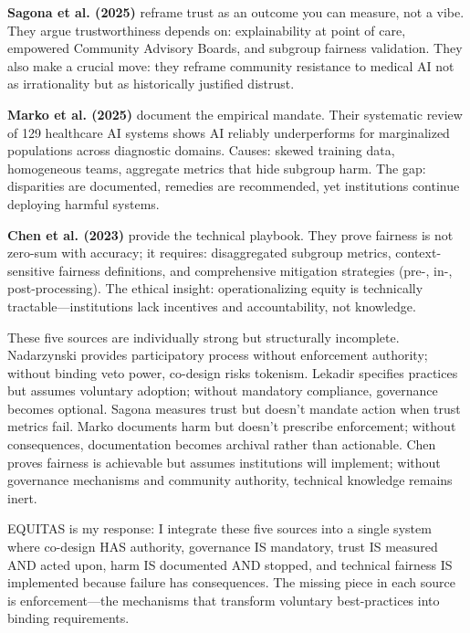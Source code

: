 \documentclass[12pt,a4paper]{article}
\begin{document}
\textbf{Sagona et al. (2025)} reframe trust as an outcome you can measure, not a vibe. They argue trustworthiness depends on: explainability at point of care, empowered Community Advisory Boards, and subgroup fairness validation. They also make a crucial move: they reframe community resistance to medical AI not as irrationality but as historically justified distrust.\cite{sagona2025}

\textbf{Marko et al. (2025)} document the empirical mandate. Their systematic review of 129 healthcare AI systems shows AI reliably underperforms for marginalized populations across diagnostic domains. Causes: skewed training data, homogeneous teams, aggregate metrics that hide subgroup harm. The gap: disparities are documented, remedies are recommended, yet institutions continue deploying harmful systems.\cite{marko2025}

\textbf{Chen et al. (2023)} provide the technical playbook. They prove fairness is not zero-sum with accuracy; it requires: disaggregated subgroup metrics, context-sensitive fairness definitions, and comprehensive mitigation strategies (pre-, in-, post-processing). The ethical insight: operationalizing equity is technically tractable—institutions lack incentives and accountability, not knowledge.\cite{chen2023}

These five sources are individually strong but structurally incomplete. Nadarzynski provides participatory process without enforcement authority; without binding veto power, co-design risks tokenism. Lekadir specifies practices but assumes voluntary adoption; without mandatory compliance, governance becomes optional. Sagona measures trust but doesn't mandate action when trust metrics fail. Marko documents harm but doesn't prescribe enforcement; without consequences, documentation becomes archival rather than actionable. Chen proves fairness is achievable but assumes institutions will implement; without governance mechanisms and community authority, technical knowledge remains inert.

EQUITAS is my response: I integrate these five sources into a single system where co-design HAS authority, governance IS mandatory, trust IS measured AND acted upon, harm IS documented AND stopped, and technical fairness IS implemented because failure has consequences. The missing piece in each source is enforcement—the mechanisms that transform voluntary best-practices into binding requirements.
\end{document}
